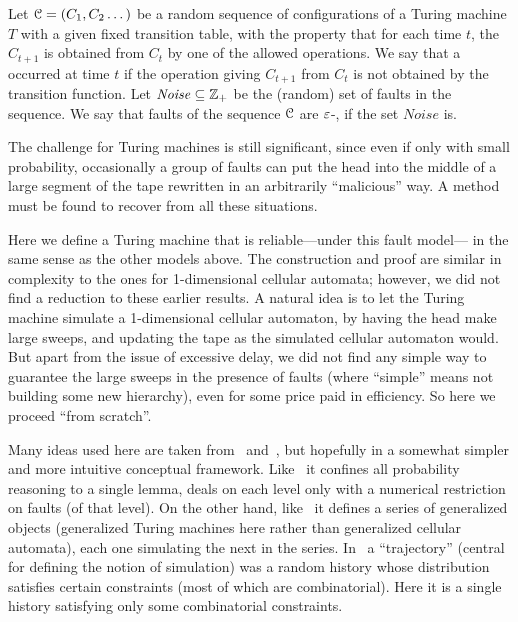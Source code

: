 \documentclass[11pt]{memoir}
\theoremstyle{definition} %
\newcommand{\Noise}{\mathit{Noise}}
\begin{document}
\begin{definition}\label{def:faults-eps-bounded}
  Let \( \mathcal{C} = (C_{1},C_{2}\dots) \) be  a random sequence of configurations of a Turing machine \( T \)
  with a given fixed
  transition table, with the property that for each time \( t \), the \( C_{t+1} \) is obtained from \( C_{t} \) by
  one of the allowed operations.
  We say that a  occurred at time \( t \) if the operation giving \( C_{t+1} \) from \( C_{t} \) is
  not obtained by the transition function.
  Let \( \Noise\subseteq\bbZ_{+} \) be the (random) set of faults in the sequence.
  We say that faults of the sequence \( \mathcal{C} \) are \( \varepsilon \)-, if the set \( \Noise \) is.  
\end{definition}

The challenge for Turing machines
is still significant, since even if only with small probability, occasionally a group
of faults can put the head into the middle of a large segment of the tape rewritten
in an arbitrarily ``malicious'' way.
A method must be found to recover from all these situations.

Here we define a Turing machine that is reliable---under this fault model--- in
the same sense as the other models above.
The construction and proof are similar in complexity to the ones for 1-di\-men\-sion\-al cellular automata;
however, we did not find a reduction to these earlier results.
A natural idea is to let the Turing machine simulate a 1-dimensional cellular automaton, by
having the head make large sweeps, and updating the tape as the simulated cellular automaton would.
But apart from the issue of excessive delay, we did not find any simple
way to guarantee the large sweeps in the presence of faults (where ``simple'' means not building some new
hierarchy), even for some price paid in efficiency.
So here we proceed ``from scratch''.

Many ideas used here are taken from~\cite{Gacs1dim86} and~\cite{GacsSorg01},
but hopefully in a somewhat simpler and more intuitive conceptual framework.
Like~\cite{Gacs1dim86} it confines all probability reasoning to a single lemma,
deals on each level only with a numerical restriction on faults (of that level).
On the other hand, like~\cite{GacsSorg01} it defines a series of generalized objects
(generalized Turing machines here rather than generalized cellular automata),
each one simulating the next in the series.
In~\cite{GacsSorg01} a ``trajectory'' (central for defining the notion of simulation) was
a random history whose distribution satisfies certain constraints (most of which are combinatorial).
Here it is a single history satisfying only some combinatorial constraints.
\end{document}
